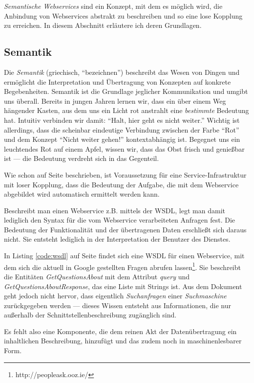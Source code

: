 
\emph{Semantische Webservices} sind ein Konzept, mit dem es möglich wird, die Anbindung von Webservices abstrakt zu beschreiben und so eine lose Kopplung zu erreichen. In diesem Abschnitt erläutere ich deren Grundlagen.

\subsection{Semantik}

Die \emph{Semantik} (griechisch, "`bezeichnen"') beschreibt das Wesen von Dingen und ermöglicht die Interpretation und Übertragung von Konzepten auf konkrete Begebenheiten. Semantik ist die Grundlage jeglicher Kommunikation und umgibt uns überall. Bereits in jungen Jahren lernen wir, dass ein über einem Weg hängender Kasten, aus dem uns ein Licht rot anstrahlt eine \emph{bestimmte} Bedeutung hat. Intuitiv verbinden wir damit: "`Halt, hier geht es nicht weiter."' Wichtig ist allerdings, dass die scheinbar eindeutige Verbindung zwischen der Farbe "`Rot"' und dem Konzept "`Nicht weiter gehen!"' kontextabhängig ist. Begegnet uns ein leuchtendes Rot auf einem Apfel, wissen wir, dass das Obst frisch und genießbar ist --- die Bedeutung verdreht sich in das Gegenteil.

Wie schon auf Seite \pageref{l:intro-loosecoupling} beschrieben, ist Voraussetzung für eine Service-Infrastruktur mit loser Kopplung, dass die Bedeutung der Aufgabe, die mit dem Webservice abgebildet wird automatisch ermittelt werden kann.

Beschreibt man einen Webservice z.B. mittels der \ac{WSDL}, legt man damit lediglich den Syntax für die vom Webservice verarbeiteten Anfragen fest. Die Bedeutung der Funktionalität und der übertragenen Daten erschließt sich daraus nicht. Sie entsteht lediglich in der Interpretation der Benutzer des Dienstes. 

In Listing \ref{code:wsdl} auf Seite \pageref{code:wsdl} findet sich eine WSDL für einen Webservice, mit dem sich die aktuell in Google gestellten Fragen abrufen lassen\footnote{http://peopleask.ooz.ie/}. Sie beschreibt die Entitäten \emph{GetQuestionsAbout} mit dem Attribut \emph{query} und \emph{GetQuestionsAboutResponse}, das eine Liste mit Strings ist. Aus dem Dokument geht jedoch nicht hervor, dass eigentlich \emph{Suchanfragen} einer \emph{Suchmaschine} zurückgegeben werden --- dieses Wissen entsteht aus Informationen, die nur außerhalb der Schnittstellenbeschreibung zugänglich sind.

Es fehlt also eine Komponente, die dem reinen Akt der Datenübertragung ein inhaltlichen Beschreibung, hinzufügt und das zudem noch in maschinenlesbarer Form.

